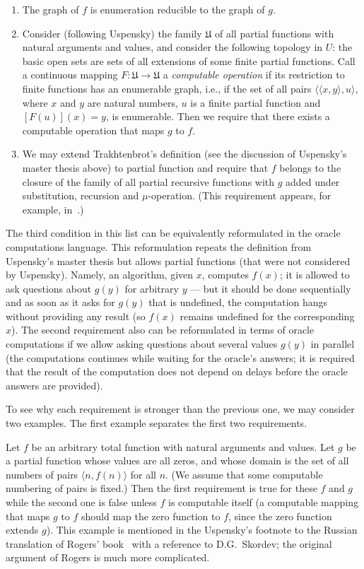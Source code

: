 \documentclass[12pt]{article}
\theoremstyle{remark}
\begin{document}
\begin{enumerate}

\item The graph of $f$ is enumeration reducible to the graph of $g$.

\item Consider (following Uspensky) the family $\mathfrak{U}$ of all partial functions with natural arguments and values, and consider the following topology in $U$: the basic open sets are sets of all extensions of some finite partial functions. Call a continuous mapping $F\colon\mathfrak{U}\to\mathfrak{U}$ a \emph{computable operation} if its restriction to finite functions has an enumerable graph, i.e., if the set of all pairs $\langle \langle x,y\rangle, u\rangle$, where $x$ and $y$ are natural numbers, $u$ is a finite partial function and $[F(u)](x)=y$,  is enumerable. Then we require that there exists a computable operation that maps $g$ to $f$.

\item We may extend Trakhtenbrot's definition (see the discussion of Uspensky's master thesis above) to partial function and require that $f$ belongs to the closure of the family of all partial recursive functions with $g$ added under substitution, recursion and $\mu$-operation. (This requirement appears, for example, in~\cite{Malcev1965}.)
\end{enumerate}

The third condition in this list can be equivalently reformulated in the oracle computations language. This reformulation repeats the definition from Uspensky's master thesis but allows partial functions (that were not considered by Uspensky). Namely, an algorithm, given $x$, computes $f(x)$; it is allowed to ask questions about $g(y)$ for arbitrary $y$ --- but it should be done sequentially and as soon as it asks for $g(y)$ that is undefined, the computation hangs without providing any result (so $f(x)$ remains undefined for the corresponding $x$). The second requirement also can be reformulated in terms of oracle computations if we allow asking questions about several values $g(y)$ in parallel (the computations continues while waiting for the oracle's answers; it is required that the result of the computation does not depend on delays before the oracle answers are provided).

To see why each requirement is stronger than the previous one, we may consider two examples. The first example separates the first two requirements.

Let $f$ be an arbitrary total function with natural arguments and values. Let $g$ be a partial function whose values are all zeros, and whose domain is the set of all numbers of pairs $\langle n,f(n)\rangle$ for all $n$. (We assume that some computable numbering of pairs is fixed.) Then the first requirement is true for these $f$ and $g$ while the second one is false unless $f$ is computable itself (a computable mapping that maps $g$ to $f$ should map the zero function to $f$, since the zero function extends $g$). This example is mentioned in the Uspensky's footnote to the Russian translation of Rogers' book~\cite[p.362]{Rogers1972} with a reference to D.G.~Skordev; the original argument of Rogers is much more complicated.
\end{document}
